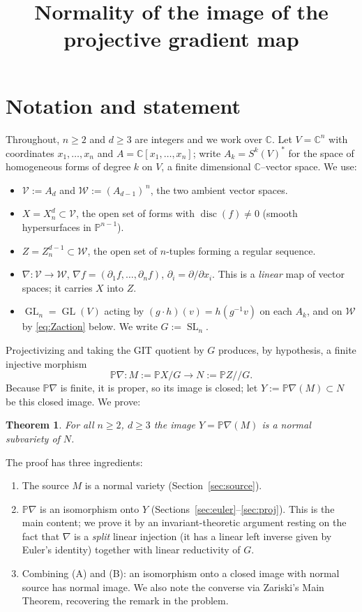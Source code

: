 \documentclass{amsart}
\newtheorem{theorem}{Theorem}
\theoremstyle{definition}
\DeclareMathOperator{\SL}{SL}
\DeclareMathOperator{\GL}{GL}
\DeclareMathOperator{\disc}{disc}
\newcommand{\PP}{\mathbb{P}}
\newcommand{\CC}{\mathbb{C}}
\newcommand{\nab}{\nabla}
\begin{document}
\title{Normality of the image of the projective gradient map}
\maketitle

\section{Notation and statement}

Throughout, $n\ge 2$ and $d\ge 3$ are integers and we work over $\CC$.
Let $V=\CC^n$ with coordinates $x_1,\dots,x_n$ and $A=\CC[x_1,\dots,x_n]$; write
$A_k=S^k(V)^{*}$ for the space of homogeneous forms of degree $k$ on $V$, a finite
dimensional $\CC$--vector space. We use:
\begin{itemize}
\item $\mathcal V:=A_d$ and $\mathcal W:=(A_{d-1})^{\,n}$, the two ambient vector spaces.
\item $X=X_n^d\subset \mathcal V$, the open set of forms with $\disc(f)\neq 0$ (smooth
hypersurfaces in $\PP^{n-1}$).
\item $Z=Z_n^{d-1}\subset \mathcal W$, the open set of $n$-tuples forming a regular sequence.
\item $\nab\colon \mathcal V\to \mathcal W$, $\nab f=(\partial_1 f,\dots,\partial_n f)$,
$\partial_i=\partial/\partial x_i$. This is a \emph{linear} map of vector spaces; it carries
$X$ into $Z$.
\item $\GL_n=\GL(V)$ acting by $(g\cdot h)(v)=h(g^{-1}v)$ on each $A_k$, and on $\mathcal W$
by \eqref{eq:Zaction} below. We write $G:=\SL_n$.
\end{itemize}

Projectivizing and taking the GIT quotient by $G$ produces, by hypothesis, a finite
injective morphism
\[
\PP\nab\colon M:=\PP X/G \longrightarrow N:=\PP Z/\!/G .
\]
Because $\PP\nab$ is finite, it is proper, so its image is closed; let
$Y:=\PP\nab(M)\subset N$ be this closed image. We prove:

\begin{theorem}\label{thm:main}
For all $n\ge 2$, $d\ge 3$ the image $Y=\PP\nab(M)$ is a normal subvariety of $N$.
\end{theorem}

The proof has three ingredients:
\begin{enumerate}
\item[(A)] The source $M$ is a normal variety (Section~\ref{sec:source}).
\item[(B)] $\PP\nab$ is an isomorphism onto $Y$ (Sections~\ref{sec:euler}--\ref{sec:proj}).
This is the main content; we prove it by an invariant-theoretic argument resting on the fact
that $\nab$ is a \emph{split} linear injection (it has a linear left inverse given by Euler's
identity) together with linear reductivity of $G$.
\item[(C)] Combining (A) and (B): an isomorphism onto a closed image with normal source has
normal image. We also note the converse via Zariski's Main Theorem, recovering the remark in
the problem.
\end{enumerate}
\end{document}
